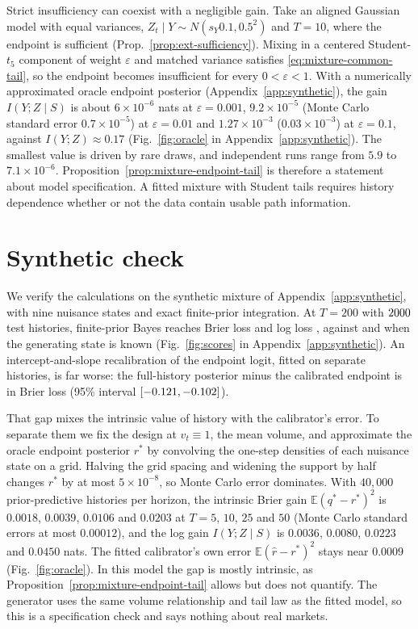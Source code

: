 \documentclass[runningheads]{llncs}
\newcommand{\E}{\mathbb E}
\begin{document}
Strict insufficiency can coexist with a negligible gain. Take an aligned Gaussian model with equal variances, $Z_t\mid Y\sim N(s_Y0.1,0.5^2)$ and $T=10$, where the endpoint is sufficient (Prop.~\ref{prop:ext-sufficiency}). Mixing in a centered Student-$t_5$ component of weight $\varepsilon$ and matched variance satisfies \eqref{eq:mixture-common-tail}, so the endpoint becomes insufficient for every $0<\varepsilon<1$. With a numerically approximated oracle endpoint posterior (Appendix~\ref{app:synthetic}), the gain $I(Y;Z\mid S)$ is about $6\times10^{-6}$ nats at $\varepsilon=0.001$, $9.2\times10^{-5}$ (Monte Carlo standard error $0.7\times10^{-5}$) at $\varepsilon=0.01$ and $1.27\times10^{-3}$ ($0.03\times10^{-3}$) at $\varepsilon=0.1$, against $I(Y;Z)\approx0.17$ (Fig.~\ref{fig:oracle} in Appendix~\ref{app:synthetic}). The smallest value is driven by rare draws, and independent runs range from $5.9$ to $7.1\times10^{-6}$. Proposition~\ref{prop:mixture-endpoint-tail} is therefore a statement about model specification. A fitted mixture with Student tails requires history dependence whether or not the data contain usable path information.

\section{Synthetic check}
\label{sec:synthetic}
We verify the calculations on the synthetic mixture of Appendix~\ref{app:synthetic}, with nine nuisance states and exact finite-prior integration. At $T=200$ with $2000$ test histories, finite-prior Bayes reaches Brier loss \PriorMarginalBrier{} and log loss \PriorMarginalLogLoss{}, against \PriorOracleBrier{} and \PriorOracleLogLoss{} when the generating state is known (Fig.~\ref{fig:scores} in Appendix~\ref{app:synthetic}). An intercept-and-slope recalibration of the endpoint logit, fitted on separate histories, is far worse: the full-history posterior minus the calibrated endpoint is \EndpointBrierDifference{} in Brier loss (95\% interval $[-0.121,-0.102]$).

That gap mixes the intrinsic value of history with the calibrator's error. To separate them we fix the design at $v_t\equiv1$, the mean volume, and approximate the oracle endpoint posterior $r^*$ by convolving the one-step densities of each nuisance state on a grid. Halving the grid spacing and widening the support by half changes $r^*$ by at most $5\times10^{-8}$, so Monte Carlo error dominates. With $40{,}000$ prior-predictive histories per horizon, the intrinsic Brier gain $\E(q^*-r^*)^2$ is $0.0018$, $0.0039$, $0.0106$ and $0.0203$ at $T=5$, $10$, $25$ and $50$ (Monte Carlo standard errors at most $0.00012$), and the log gain $I(Y;Z\mid S)$ is $0.0036$, $0.0080$, $0.0223$ and $0.0450$ nats. The fitted calibrator's own error $\E(\widehat r-r^*)^2$ stays near $0.0009$ (Fig.~\ref{fig:oracle}). In this model the gap is mostly intrinsic, as Proposition~\ref{prop:mixture-endpoint-tail} allows but does not quantify. The generator uses the same volume relationship and tail law as the fitted model, so this is a specification check and says nothing about real markets.
\end{document}

